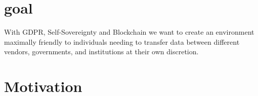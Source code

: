 \section{goal}
With GDPR, Self-Sovereignty and Blockchain we want to create an environment maximally friendly to individuals needing to transfer data between different vendors, governments, and institutions at their own discretion.	
	




\section{Motivation}